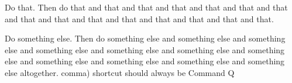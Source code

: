 \win{}Do that. Then do that
and that and that
and that and that
and that and that
and that and that
and that and that
and that and that
and that and that.

\osx{}Do something else. 
Then do something else and 
something else and
something else and
something else and
something else and
something else and
something else and
something else and
something else and
something else and
something else altogether.
comma)
shortcut should always be Command Q




